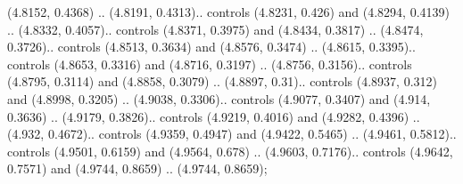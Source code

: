 (4.8152, 0.4368) .. (4.8191, 0.4313).. controls (4.8231, 0.426) and (4.8294, 0.4139) .. (4.8332, 0.4057).. controls (4.8371, 0.3975) and (4.8434, 0.3817) .. (4.8474, 0.3726).. controls (4.8513, 0.3634) and (4.8576, 0.3474) .. (4.8615, 0.3395).. controls (4.8653, 0.3316) and (4.8716, 0.3197) .. (4.8756, 0.3156).. controls (4.8795, 0.3114) and (4.8858, 0.3079) .. (4.8897, 0.31).. controls (4.8937, 0.312) and (4.8998, 0.3205) .. (4.9038, 0.3306).. controls (4.9077, 0.3407) and (4.914, 0.3636) .. (4.9179, 0.3826).. controls (4.9219, 0.4016) and (4.9282, 0.4396) .. (4.932, 0.4672).. controls (4.9359, 0.4947) and (4.9422, 0.5465) .. (4.9461, 0.5812).. controls (4.9501, 0.6159) and (4.9564, 0.678) .. (4.9603, 0.7176).. controls (4.9642, 0.7571) and (4.9744, 0.8659) .. (4.9744, 0.8659);



